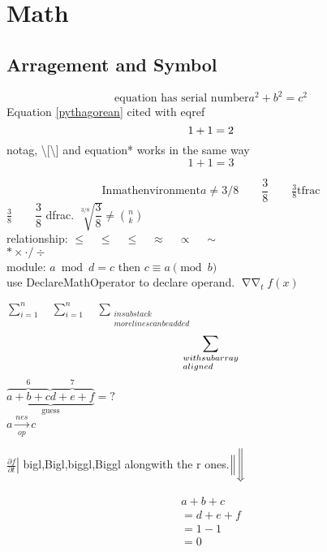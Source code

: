 \documentclass{article}
\DeclareMathOperator*{\NN}{\nabla\nabla}
\begin{document}
\section{Math}
\subsection{Arragement and Symbol}
   \begin{equation}
     \text{equation has serial number} a^2+b^2=c^2\label{pythagorean}
   \end{equation}
   Equation \eqref{pythagorean} cited with eqref
   \begin{equation}
    1 + 1 = 2 \notag
   \end{equation}
   notag, \textbackslash[\textbackslash] and equation* works in the same way
    \begin{equation}
        1 + 1 = 3 \tag{wrong}
    \end{equation}

   \[\mathrm{In math environment} a \neq 3/8 \qquad \frac{3}{8} \qquad \tfrac{3}{8} \text{tfrac}\] 
   $\frac{3}{8} \qquad \dfrac{3}{8}$ dfrac.  $\sqrt[3/8]{\dfrac{3}{8}} \neq \binom{n}{k}$\\
   relationship: $\leq \quad \le \quad \leqslant \quad \approx \quad \propto \quad \sim$\\
   $* \times\cdot/\div$\\
    module: $a\bmod d=c$ then $c\equiv a\pmod{b}$\\
    use DeclareMathOperator to declare operand. $\NN_{t} f(x)$

    $\sum\limits_{i=1}^n \quad \sum\nolimits_{i=1}^n \quad \sum\limits_{\substack{in substack \\ more lines can be added}} $\[\sum\limits_{\begin{subarray}{l} with subarray\\ aligned \end{subarray}}\]
    $\underbrace{\overbrace{a+b+c}^6\overbrace{d+e+f}^7}_\text{guess} = ?$\\
    $a\xrightarrow[op]{nes}c$

    $\left.\frac{\partial f}{\partial t}\right|$  bigl,Bigl,biggl,Biggl alongwith the r ones.$\Big\|\Bigg\Downarrow$

    \begin{multline}
    a + b + c \\
    = d + e + f \\
    = 1 - 1 \\
    = 0
    \end{multline}
\end{document}
